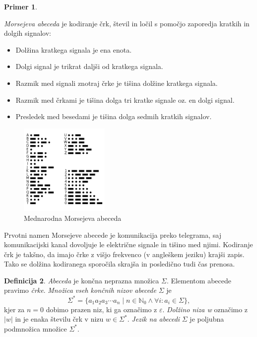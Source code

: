 \documentclass{amsart}
\newcommand{\N}{\mathbb{N}}
\theoremstyle{definition} %
\newtheorem{definicija}{Definicija}[section]
\newtheorem{primer}[definicija]{Primer}
\theoremstyle{plain} %
\begin{document}
\begin{primer}\label{Morse}

    \textit{Morsejeva abeceda} je kodiranje črk, števil in ločil s pomočjo zaporedja kratkih
    in dolgih signalov:

    \begin{itemize}
        \item Dolžina kratkega signala je ena enota.
        \item Dolgi signal je trikrat daljši od kratkega signala.
        \item Razmik med signali znotraj črke je tišina dolžine kratkega signala.
        \item Razmik med črkami je tišina dolga tri kratke signale oz. en dolgi signal.
        \item Presledek med besedami je tišina dolga sedmih kratkih signalov.
    \end{itemize}

    \begin{figure}[h]
        \centering
        \includegraphics[width=4.3cm]{International_Morse_Code.svg.png}
        \caption{Mednarodna Morsejeva abeceda}
        \label{fig:Morse}
    \end{figure}

    Prvotni namen Morsejeve abecede je komunikacija preko telegrama, saj komunikacijski
    kanal dovoljuje le električne signale in tišino med njimi. Kodiranje črk je takšno,
    da imajo črke z višjo frekvenco (v angleškem jeziku) krajši zapis. Tako se dolžina
    kodiranega sporočila skrajša in posledično tudi čas prenosa.

\end{primer}

\begin{definicija}

    \textit{Abeceda} je končna neprazna množica $ \Sigma $. Elementom abecede pravimo \textit{črke}.
    \textit{Množica vseh končnih nizov abecede} $ \Sigma $ je
    \[
        \Sigma^* = \{ a_1 a_2 a_3 \cdots a_n \mid n \in \N_0 \land \forall i: a_i \in \Sigma \}, 
    \]
    kjer za $ n = 0 $ dobimo prazen niz, ki ga označimo z $ \varepsilon $.
    \textit{Dolžino niza w} označimo z $ |w| $ in je enaka številu črk v nizu $ w \in \Sigma^* $.
    \textit{Jezik na abecedi} $ \Sigma $ je poljubna podmnožica množice $ \Sigma^* $. 

\end{definicija}
\end{document}
